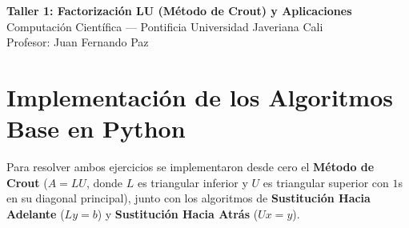 \documentclass[11pt,a4paper]{article}
\begin{document}
\begin{center}
    {\LARGE\bfseries\color{pujblue} Taller 1: Factorización LU (Método de Crout) y Aplicaciones}\\[0.3cm]
    {\large Computación Científica --- Pontificia Universidad Javeriana Cali}\\[0.1cm]
    {\normalsize Profesor: Juan Fernando Paz}
\end{center}
\vspace{0.3cm}

\section{Implementación de los Algoritmos Base en Python}

Para resolver ambos ejercicios se implementaron desde cero el \textbf{Método de Crout} ($A = LU$, donde $L$ es triangular inferior y $U$ es triangular superior con $1$s en su diagonal principal), junto con los algoritmos de \textbf{Sustitución Hacia Adelante} ($Ly = b$) y \textbf{Sustitución Hacia Atrás} ($Ux = y$).
\end{document}
